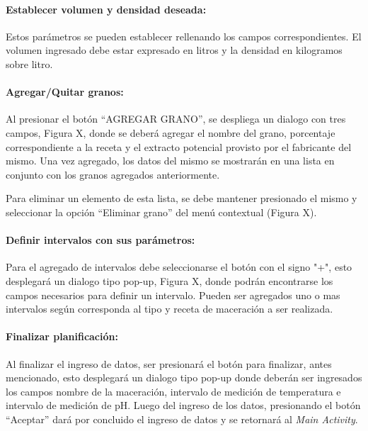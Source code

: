                 \paragraph{Establecer volumen y densidad deseada:}
                Estos parámetros se pueden establecer rellenando los campos correspondientes. El volumen ingresado debe estar expresado en litros y la densidad en kilogramos sobre litro.
                
                \paragraph{Agregar/Quitar granos:}
                Al presionar el botón ``AGREGAR GRANO'', se despliega un dialogo con tres campos, Figura X,  donde se deberá agregar el nombre del grano, porcentaje correspondiente a la receta y el extracto potencial provisto por el fabricante del mismo. Una vez agregado, los datos del mismo se mostrarán en una lista en conjunto con los granos agregados anteriormente.
                \par Para eliminar un elemento de esta lista, se debe mantener presionado el mismo y seleccionar la opción ``Eliminar grano'' del menú contextual (Figura X).
                
                \paragraph{Definir intervalos con sus parámetros:}
                Para el agregado de intervalos debe seleccionarse el botón con el signo "+", esto desplegará un dialogo tipo pop-up, Figura X, donde podrán encontrarse los campos necesarios para definir un intervalo. Pueden ser agregados uno o mas intervalos según corresponda al tipo y receta de maceración a ser realizada.
                
                \paragraph{Finalizar planificación:}
                Al finalizar el ingreso de datos, ser presionará el botón para finalizar, antes mencionado, esto desplegará un dialogo tipo pop-up donde deberán ser ingresados los campos nombre de la maceración, intervalo de medición de temperatura e intervalo de medición de pH. Luego del ingreso de los datos, presionando el botón ``Aceptar'' dará por concluido el ingreso de datos y se retornará al \textit{Main Activity}.
                
